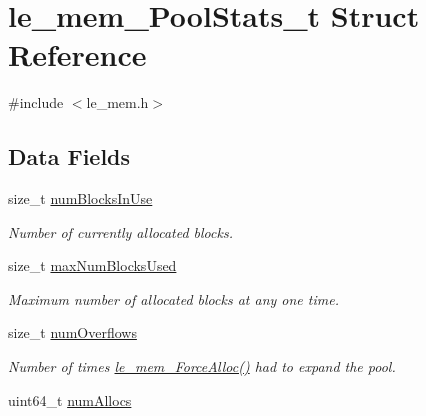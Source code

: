 \hypertarget{structle__mem___pool_stats__t}{}\section{le\+\_\+mem\+\_\+\+Pool\+Stats\+\_\+t Struct Reference}
\label{structle__mem___pool_stats__t}


{\ttfamily \#include $<$le\+\_\+mem.\+h$>$}

\subsection*{Data Fields}
\begin{DoxyCompactItemize}
\item 
\hypertarget{structle__mem___pool_stats__t_a313be0351549e89c5137819f67b72e3b}{}size\+\_\+t \hyperlink{structle__mem___pool_stats__t_a313be0351549e89c5137819f67b72e3b}{num\+Blocks\+In\+Use}\label{structle__mem___pool_stats__t_a313be0351549e89c5137819f67b72e3b}

\begin{DoxyCompactList}\small\item\em Number of currently allocated blocks. \end{DoxyCompactList}\item 
\hypertarget{structle__mem___pool_stats__t_ae0ecac2638936865038492db1e7d3d20}{}size\+\_\+t \hyperlink{structle__mem___pool_stats__t_ae0ecac2638936865038492db1e7d3d20}{max\+Num\+Blocks\+Used}\label{structle__mem___pool_stats__t_ae0ecac2638936865038492db1e7d3d20}

\begin{DoxyCompactList}\small\item\em Maximum number of allocated blocks at any one time. \end{DoxyCompactList}\item 
\hypertarget{structle__mem___pool_stats__t_ae60202bce92af5ecb9b0f4a2312be7ec}{}size\+\_\+t \hyperlink{structle__mem___pool_stats__t_ae60202bce92af5ecb9b0f4a2312be7ec}{num\+Overflows}\label{structle__mem___pool_stats__t_ae60202bce92af5ecb9b0f4a2312be7ec}

\begin{DoxyCompactList}\small\item\em Number of times \hyperlink{le__mem_8h_af7c289c73d4182835a26a9099f3db359}{le\+\_\+mem\+\_\+\+Force\+Alloc()} had to expand the pool. \end{DoxyCompactList}\item 
\hypertarget{structle__mem___pool_stats__t_abcfdbe19fa0d2deb6bc57858fc0c4512}{}uint64\+\_\+t \hyperlink{structle__mem___pool_stats__t_abcfdbe19fa0d2deb6bc57858fc0c4512}{num\+Allocs}\label{structle__mem___pool_stats__t_abcfdbe19fa0d2deb6bc57858fc0c4512}


\end{DoxyCompactItemize}
